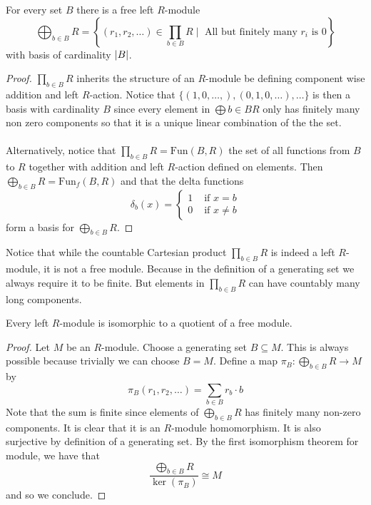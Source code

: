 \documentclass[a4paper]{article}
\begin{document}
\begin{lmm}{}{} For every set $B$ there is a free left $R$-module $$\bigoplus_{b\in B}R=\left\{(r_1,r_2,\dots)\in\prod_{b\in B}R\;|\;\text{ All but finitely many }r_i\text{ is }0\right\}$$ with basis of cardinality $\abs{B}$. \tcbline
\begin{proof}
$\prod_{b\in B}R$ inherits the structure of an $R$-module be defining component wise addition and left $R$-action. Notice that $\{(1,0,\dots,),(0,1,0,\dots),\dots\}$ is then a basis with cardinality $B$ since every element in $\bigoplus{b\in B}R$ only has finitely many non zero components so that it is a unique linear combination of the the set. \\~\\

Alternatively, notice that $\prod_{b\in B}R=\text{Fun}(B,R)$ the set of all functions from $B$ to $R$ together with addition and left $R$-action defined on elements. Then $\bigoplus_{b\in B}R=\text{Fun}_f(B,R)$ and that the delta functions $$\delta_b(x)=\begin{cases}
1 & \text{ if } x=b\\
0 & \text{ if } x\neq b
\end{cases}$$ form a basis for $\bigoplus_{b\in B}R$. 
\end{proof}
\end{lmm}

Notice that while the countable Cartesian product $\prod_{b\in B}R$ is indeed a left $R$-module, it is not a free module. Because in the definition of a generating set we always require it to be finite. But elements in $\prod_{b\in B}R$ can have countably many long components. 

\begin{lmm}{}{} Every left $R$-module is isomorphic to a quotient of a free module. \tcbline
\begin{proof}
Let $M$ be an $R$-module. Choose a generating set $B\subseteq M$. This is always possible because trivially we can choose $B=M$. Define a map $\pi_B:\bigoplus_{b\in B}R\to M$ by $$\pi_B(r_1,r_2,\dots)=\sum_{b\in B}r_b\cdot b$$ Note that the sum is finite since elements of $\bigoplus_{b\in B}R$ has finitely many non-zero components. It is clear that it is an $R$-module homomorphism. It is also surjective by definition of a generating set. By the first isomorphism theorem for module, we have that $$\frac{\bigoplus_{b\in B}R}{\ker(\pi_B)}\cong M$$ and so we conclude. 
\end{proof}
\end{lmm}
\end{document}

